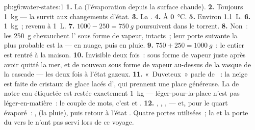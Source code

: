 \begin{solution}{pb:g6:water-states:1}
\textbf{1.} La  (l'évaporation depuis la surface
chaude).
\textbf{2.} Toujours \qty{1}{kg} --- la  survit aux changements
d'état.
\textbf{3.} La .
\textbf{4.} À \qty{0}{\celsius}.
\textbf{5.} Environ \qty{1.1}{L}.
\textbf{6.}  \qty{1}{kg}~;  revenu à \qty{1}{L}.
\textbf{7.} $1000 - 250 = \qty{750}{g}$ poursuivent dans le torrent.
\textbf{8.} Non~: les \qty{250}{g} chevauchent l' sous forme de
vapeur, intacts~; leur porte suivante la plus probable est la
 --- en nuage, puis en pluie.
\textbf{9.} $750 + 250 = \qty{1000}{g}$~: le  entier est
rentré à la maison.
\textbf{10.} Invisible deux fois~: sous forme de vapeur juste après
avoir quitté la mer, et de nouveau sous forme de vapeur au-dessus de
la vasque de la cascade --- les deux fois à l'état gazeux.
\textbf{11.} «~Duveteux~» parle de \emph{}~: la neige est faite
de cristaux de glace lacés d', qui prennent une place généreuse.
La \emph{} de notre eau étiquetée est restée exactement
\qty{1}{kg} --- léger-pour-la-place n'est pas léger-en-matière~: le
couple de mots, c'est  et .
\textbf{12.} , , ,  ---
et, pour le quart évaporé~: ,  (la pluie),
puis retour à l'état . Quatre portes utilisées~; la
 et la porte du  vers le  n'ont pas servi lors de
ce voyage.
\end{solution}
